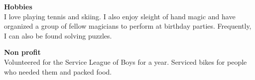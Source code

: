 \documentclass[9pt]{resume}
\begin{document}
    \vspace{0.4cm}
    \begin{minipage}[t]{0.6\textwidth}
        \vspace{-\baselineskip} %
        
        {\Large \textbf{Hobbies}}
        \\I love playing tennis and skiing. I also enjoy sleight of hand magic and have organized a group of fellow magicians to perform at birthday parties.
        Frequently, I can also be found solving puzzles. 
    \end{minipage}
    \hfill
    \begin{minipage}[t]{0.35\textwidth}
        \vspace{-\baselineskip} %
        
        {\Large \textbf{Non profit}}
        \\Volunteered for the Service League of Boys for a year. Serviced bikes for people who needed them and packed food. 
    \end{minipage}
\end{document}
